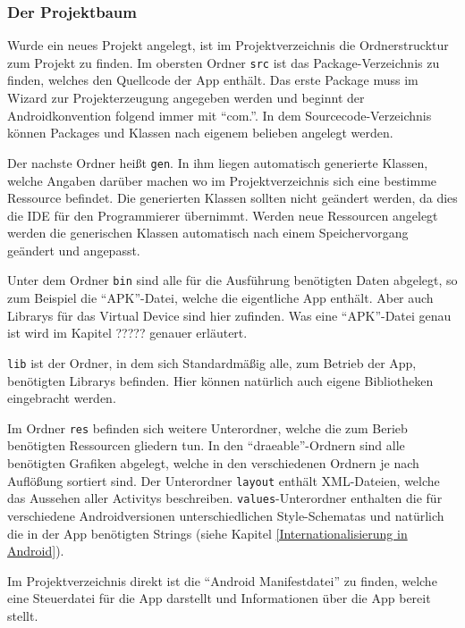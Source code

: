 \subsubsection{Der Projektbaum}
Wurde ein neues Projekt angelegt, ist im Projektverzeichnis die Ordnerstrucktur zum Projekt zu finden. Im obersten Ordner \texttt{src} ist das Package-Verzeichnis zu finden, welches den Quellcode der App enth\"alt. Das erste Package muss im Wizard zur Projekterzeugung angegeben werden und beginnt der Androidkonvention folgend immer mit "`com."'. In dem Sourcecode-Verzeichnis k\"onnen Packages und Klassen nach eigenem belieben angelegt werden.

Der nachste Ordner hei\ss{}t \texttt{gen}. In ihm liegen automatisch generierte Klassen, welche Angaben dar\"uber machen wo im Projektverzeichnis sich eine bestimme Ressource befindet.
Die generierten Klassen sollten nicht ge\"andert werden, da dies die \ac{IDE} f\"ur den Programmierer \"ubernimmt. Werden neue Ressourcen angelegt werden die generischen Klassen automatisch nach einem Speichervorgang ge\"andert und angepasst.

Unter dem Ordner \texttt{bin} sind alle f\"ur die Ausf\"uhrung ben\"otigten Daten abgelegt, so zum Beispiel die "`APK"'-Datei, welche die eigentliche App enth\"alt. Aber auch Librarys f\"ur das Virtual Device sind hier zufinden. Was eine "`APK"'-Datei genau ist wird im Kapitel ????? genauer erl\"autert.

\texttt{lib} ist der Ordner, in dem sich Standardm\"a\ss{}ig alle, zum Betrieb der App, ben\"otigten Librarys befinden. Hier k\"onnen nat\"urlich auch eigene Bibliotheken eingebracht werden.

Im Ordner \texttt{res} befinden sich weitere Unterordner, welche die zum Berieb ben\"otigten Ressourcen gliedern tun. In den "`draeable"'-Ordnern sind alle ben\"otigten Grafiken abgelegt, welche in den verschiedenen Ordnern je nach Aufl\"o\ss{}ung sortiert sind. Der Unterordner \texttt{layout} enth\"alt XML-Dateien, welche das Aussehen aller Activitys beschreiben. \texttt{values}-Unterordner enthalten die f\"ur verschiedene Androidversionen unterschiedlichen Style-Schematas und nat\"urlich die in der App ben\"otigten Strings (siehe Kapitel \ref{Internationalisierung in Android}).

Im Projektverzeichnis direkt ist die "`Android Manifestdatei"' zu finden, welche eine Steuerdatei f\"ur die App darstellt und Informationen \"uber die App bereit stellt.
\cite{GolemHBRessourcen}

